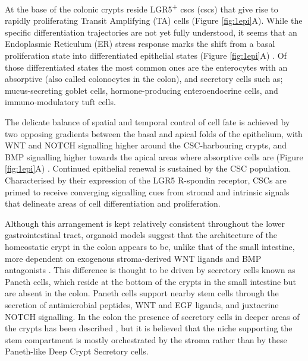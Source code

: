 At the base of the colonic crypts reside LGR5\textsuperscript{+} \acrlong{csc}s (\acrshort{csc}s) that give rise to rapidly proliferating Transit Amplifying (TA) cells (Figure \ref{fig:1epi}A). While the specific differentiation trajectories are not yet fully understood, it seems that an Endoplasmic Reticulum (ER) stress response marks the shift from a basal proliferation state into differentiated epithelial states (Figure \ref{fig:1epi}A) \cite{heijmans_er_2013, coleman_er_2019}. Of those differentiated states the most common ones are the enterocytes with an absorptive (also called colonocytes in the colon), and secretory cells such as; mucus-secreting goblet cells, hormone-producing enteroendocrine cells, and immuno-modulatory tuft cells. 

The delicate balance of spatial and temporal control of cell fate is achieved by two opposing gradients between the basal and apical folds of the epithelium, with WNT and NOTCH signalling higher around the CSC-harbouring crypts, and BMP signalling higher towards the apical areas where absorptive cells are (Figure \ref{fig:1epi}A) \cite{bonis_intestinal_2021, beumer_cell_2021}. Continued epithelial renewal is sustained by the CSC population. Characterised by their expression of the LGR5 R-spondin receptor, CSCs are primed to receive converging signalling cues from stromal and intrinsic signals that delineate areas of cell differentiation and proliferation. 

Although this arrangement is kept relatively consistent throughout the lower gastrointestinal tract, organoid models suggest that the architecture of the homeostatic crypt in the colon appears to be, unlike that of the small intestine, more dependent on exogenous stroma-derived WNT ligands and BMP antagonists \cite{sato_long-term_2011, kondo_emerging_2019}. This difference is thought to be driven by secretory cells known as Paneth cells, which reside at the bottom of the crypts in the small intestine but are absent in the colon. Paneth cells support nearby stem cells through the secretion of antimicrobial peptides, WNT and EGF ligands, and juxtacrine NOTCH signalling. In the colon the presence of secretory cells in deeper areas of the crypts has been described \cite{sasaki_reg4_2016}, but it is believed that the niche supporting the stem compartment is mostly orchestrated by the stroma rather than by these Paneth-like Deep Crypt Secretory cells.

